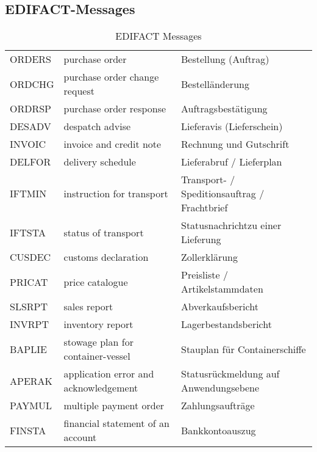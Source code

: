 	\subsection{EDIFACT-Messages}
		\begin{table}[!h]
			\centering
			\caption{EDIFACT Messages}
			\label{my-label}
			\begin{tabular}{lll}
				ORDERS & purchase order                        & Bestellung (Auftrag)                         \\
				ORDCHG & purchase order change request         & Bestelländerung                              \\
				ORDRSP & purchase order response               & Auftragsbestätigung                          \\
				DESADV & despatch advise                       & Lieferavis (Lieferschein)                    \\
				INVOIC & invoice and credit note               & Rechnung und Gutschrift                      \\
				DELFOR & delivery schedule                     & Lieferabruf / Lieferplan                     \\
				IFTMIN & instruction for transport             & Transport- / Speditionsauftrag / Frachtbrief \\
				IFTSTA & status of transport                   & Statusnachrichtzu einer Lieferung            \\
				CUSDEC & customs declaration                   & Zollerklärung                                \\
				PRICAT & price catalogue                       & Preisliste / Artikelstammdaten               \\
				SLSRPT & sales report                          & Abverkaufsbericht                            \\
				INVRPT & inventory report                      & Lagerbestandsbericht                         \\
				BAPLIE & stowage plan for container-vessel     & Stauplan für Containerschiffe                \\
				APERAK & application error and acknowledgement & Statusrückmeldung auf Anwendungsebene        \\
				PAYMUL & multiple payment order                & Zahlungsaufträge                             \\
				FINSTA & financial statement of an account     & Bankkontoauszug                             
				\end{tabular}
				\end{table}
		
